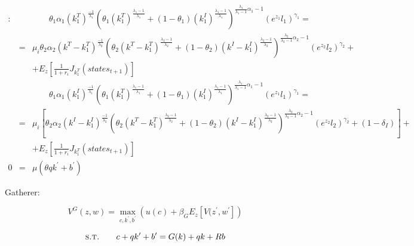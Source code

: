 \documentclass{article}
\begin{document}
\begin{eqnarray*}
 [k_1^T]: & & \quad \quad                                                    \theta_1 \alpha_1 (k_{1}^T)^{\frac{-1}{\lambda_1}} \left( \theta_1 (k_{1}^T)^{\frac{\lambda_1-1}{\lambda_1}} +(1-\theta_1)(k_{1}^I)^{\frac{\lambda_1-1}{\lambda_1}} \right)^{\frac{\lambda_1}{\lambda_1-1}\alpha_1-1} \left( e^{z_{1}}l_{1} \right)^{\gamma_1}   =  \\
  & = & \mu_i \theta_2 \alpha_2 (k^T - k_{1}^T)^{\frac{-1}{\lambda_2}} \left( \theta_2 (k^T - k_{1}^T)^{\frac{\lambda_2-1}{\lambda_2}} +(1-\theta_2)(k^I - k_{1}^I)^{\frac{\lambda_2-1}{\lambda_2}} \right)^{\frac{\lambda_2}{\lambda_2-1}\alpha_2-1} \left( e^{z_{2}}l_{2} \right)^{\gamma_2} + \\
  &   & + E_z\left[\frac{1}{1+r_i} J_{k_1^T}(states_{t+1})   \right]  \\
 & & \quad \quad        \theta_1 \alpha_1 (k_{1}^I)^{\frac{-1}{\lambda_1}} \left( \theta_1 (k_{1}^T)^{\frac{\lambda_1-1}{\lambda_1}} +(1-\theta_1)(k_{1}^I )^{\frac{\lambda_1-1}{\lambda_1}} \right)^{\frac{\lambda_1}{\lambda_1-1}\alpha_1-1}  \left( e^{z_{1}} l_1 \right)^{\gamma_1}   =  \\
   & = & \mu_i\left[ \theta_2 \alpha_2 (k^I - k_{1}^I)^{\frac{-1}{\lambda_2}} \left( \theta_2 (k^T - k_{1}^T)^{\frac{\lambda_2-1}{\lambda_2}} +(1-\theta_2)(k^I - k_{1}^I)^{\frac{\lambda_2-1}{\lambda_2}} \right)^{\frac{\lambda_2}{\lambda_2-1}\alpha_2-1} \left( e^{z_{2}}l_{2} \right)^{\gamma_2} + (1-\delta_I) \right]+ \\
  &   &  + E_z\left[\frac{1}{1+r_i} J_{k_1^T}(states_{t+1})   \right]  \\
 0 & = & \mu (\theta q k^\prime + b^\prime) 
\end{eqnarray*}

Gatherer:

$$ V^G(z,w) = \max_{c,k^{\prime},b^{\prime} } \left( u(c) + \beta_G E_z \left[ V(z^{\prime},w^{\prime} \right]  \right) $$

$$ \textsc{s.t.} \quad \quad c+qk^\prime+b^\prime = G(k) + qk +Rb$$
\end{document}
